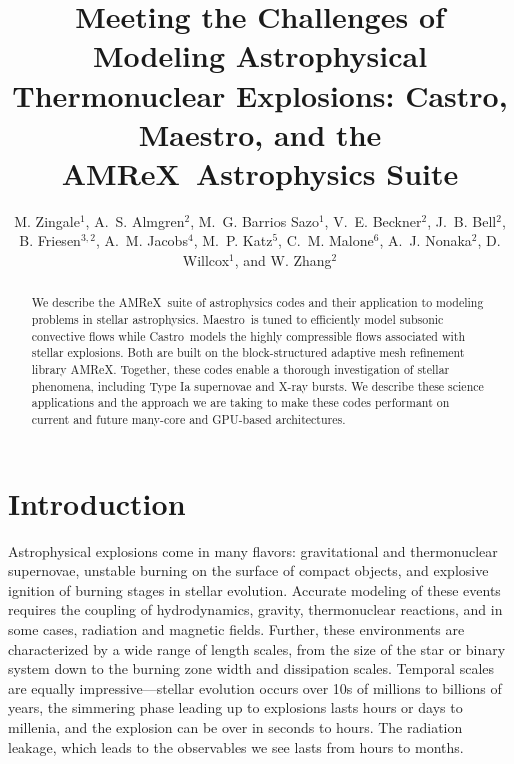 \documentclass[a4paper]{jpconf}
\newcommand{\maestro}{{\sffamily Maestro}}
\newcommand{\castro}{{\sffamily Castro}}
\newcommand{\amrex}{{\sffamily AMReX}}
\begin{document}
\title{Meeting the Challenges of Modeling Astrophysical Thermonuclear Explosions:
\castro, \maestro, and the \amrex\ Astrophysics Suite}

\author{M. Zingale$^1$,
        A.~S. Almgren$^2$,
        M.~G. Barrios Sazo$^1$,
        V.~E. Beckner$^2$,
        J.~B. Bell$^2$,
        B. Friesen$^{3,2}$,
        A.~M. Jacobs$^4$,
        M.~P. Katz$^5$,
        C.~M. Malone$^6$,
        A.~J. Nonaka$^2$,
        D. Willcox$^1$, and
        W. Zhang$^2$}

\address{$^1$Department of Physics and Astronomy, Stony Brook
  University, Stony Brook, NY 11794-3800 USA}

\address{$^2$Center for Computational Sciences and Engineering,
  Lawrence Berkeley National Lab, Berkeley, CA 94720 USA}

\address{$^3$National Energy Research Scientific Computing Center,
  Lawrence Berkeley National Lab, Berkeley, CA 94720 USA}

\address{$^4$Department of Physics and Astronomy, Michigan State
  University, East Lansing, Michigan 48824 USA}

\address{$^5$NVIDIA Corporation, 2788 San Tomas Expressway,
  Santa Clara, CA, 95050 USA}

\address{$^6$Los Alamos National Laboratory, Los Alamos, NM, 87545 USA}

\begin{abstract}
We describe the \amrex\ suite of astrophysics codes and their
application to modeling problems in stellar astrophysics.
\maestro\ is tuned to efficiently model subsonic convective flows
while \castro\ models the highly compressible flows associated with
stellar explosions.  Both are built on the block-structured adaptive
mesh refinement library \amrex.  Together, these codes enable a
thorough investigation of stellar phenomena, including Type Ia
supernovae and X-ray bursts.  We describe these science applications
and the approach we are taking to make these codes performant on
current and future many-core and GPU-based architectures.
\end{abstract}




\section{Introduction}

Astrophysical explosions come in many flavors: gravitational and
thermonuclear supernovae, unstable burning on the surface of compact
objects, and explosive ignition of burning stages in stellar
evolution.  Accurate modeling of these events requires the coupling of
hydrodynamics, gravity, thermonuclear reactions, and in some cases,
radiation and magnetic fields.  Further, these environments are
characterized by a wide range of length scales, from the size of the
star or binary system down to the burning zone width and dissipation
scales.  Temporal scales are equally impressive---stellar evolution
occurs over 10s of millions to billions of years, the simmering phase
leading up to explosions lasts hours or days to millenia, and the
explosion can be over in seconds to hours.  The radiation leakage,
which leads to the observables we see lasts from hours to months.
\end{document}
